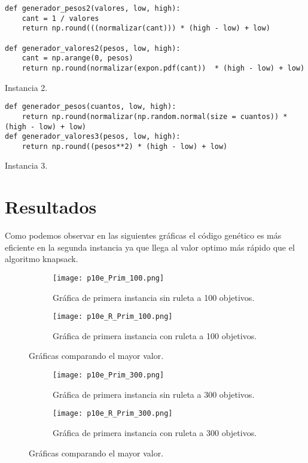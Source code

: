 \documentclass{article}
\begin{document}
\renewcommand{\listingscaption}{Código}
\begin{listing}[H]
  \begin{verbatim}
def generador_pesos2(valores, low, high):
    cant = 1 / valores
    return np.round(((normalizar(cant))) * (high - low) + low)
 
def generador_valores2(pesos, low, high):
    cant = np.arange(0, pesos)  
    return np.round(normalizar(expon.pdf(cant))  * (high - low) + low)
      \end{verbatim}
  \label{lst:fibo}
  \caption{Instancia 2.}
\end{listing}

\renewcommand{\listingscaption}{Código}
\begin{listing}[H]
  \begin{verbatim}
def generador_pesos(cuantos, low, high):
    return np.round(normalizar(np.random.normal(size = cuantos)) * (high - low) + low)
def generador_valores3(pesos, low, high):
    return np.round((pesos**2) * (high - low) + low)
      \end{verbatim}
  \label{lst:fibo}
  \caption{Instancia 3.}
\end{listing}


\section{Resultados}

Como podemos observar en las siguientes gráficas el código genético es más eficiente en la segunda instancia ya que llega al valor optimo más rápido que el algoritmo knapsack.

\begin{figure}[H]
\centering
\begin{subfigure}[b]{0.40\linewidth}
\texttt{[image: p10e\_Prim\_100.png]}
\caption{Gráfica de primera instancia sin ruleta a 100 objetivos.}
\end{subfigure}
\begin{subfigure}[b]{0.40\linewidth}
\texttt{[image: p10e\_R\_Prim\_100.png]}
\caption{Gráfica de primera instancia con ruleta a 100 objetivos.}
\end{subfigure}
\caption{Gráficas comparando el mayor valor.}
\label{fig:westminster}
\end{figure}

\begin{figure}[H]
\centering
\begin{subfigure}[b]{0.40\linewidth}
\texttt{[image: p10e\_Prim\_300.png]}
\caption{Gráfica de primera instancia sin ruleta a 300 objetivos.}
\end{subfigure}
\begin{subfigure}[b]{0.40\linewidth}
\texttt{[image: p10e\_R\_Prim\_300.png]}
\caption{Gráfica de primera instancia con ruleta a 300 objetivos.}
\end{subfigure}
\caption{Gráficas comparando el mayor valor.}
\label{fig:westminster}
\end{figure}
\end{document}

